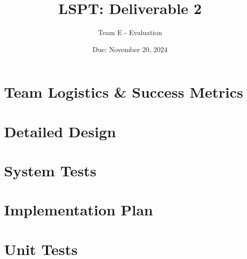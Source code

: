 \documentclass{article}
\title{LSPT: Deliverable 2}
\author{Team E - Evaluation}
\date{Due: November 20, 2024}
\begin{document}
  \maketitle
  \section*{Team Logistics \& Success Metrics}
  

  \section*{Detailed Design}
  
  
  \section*{System Tests}
  

  \section*{Implementation Plan}
  

  \section*{Unit Tests}
  
\end{document}
